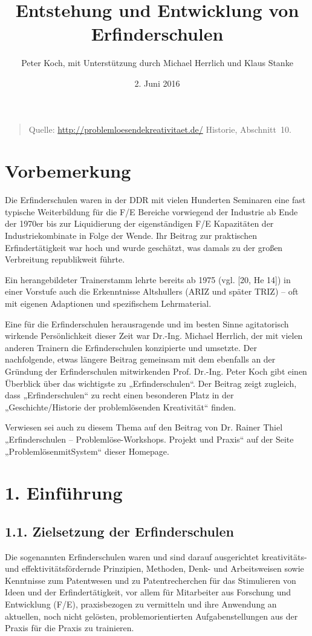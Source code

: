 \documentclass[11pt,a4paper]{article}
\title{Entstehung und Entwicklung von Erfinderschulen}
\author{Peter Koch, mit Unterstützung durch Michael Herrlich und Klaus Stanke}
\date{2. Juni 2016}
\begin{document}
\maketitle

\begin{quote}
  Quelle: \url{http://problemloesendekreativitaet.de/} Historie, Abschnitt~10.

\end{quote}

\section*{Vorbemerkung}

Die Erfinderschulen waren in der DDR mit vielen Hunderten Seminaren eine fast
typische Weiterbildung für die F/E Bereiche vorwiegend der Industrie ab Ende
der 1970er bis zur Liquidierung der eigenständigen F/E Kapazitäten der
Industriekombinate in Folge der Wende. Ihr Beitrag zur praktischen
Erfindertätigkeit war hoch und wurde geschätzt, was damals zu der großen
Verbreitung republikweit führte. 

Ein herangebildeter Trainerstamm lehrte bereits ab 1975 (vgl. [20, He 14]) in
einer Vorstufe auch die Erkenntnisse Altshullers (ARIZ und später TRIZ) – oft
mit eigenen Adaptionen und spezifischem Lehrmaterial.

Eine für die Erfinderschulen herausragende und im besten Sinne agitatorisch
wirkende Per\-sön\-lich\-keit dieser Zeit war Dr.-Ing. Michael Herrlich, der
mit vielen anderen Trainern die Erfinderschulen konzipierte und umsetzte. Der
nachfolgende, etwas längere Beitrag gemeinsam mit dem ebenfalls an der
Gründung der Erfinderschulen mitwirkenden Prof. Dr.-Ing. Peter Koch gibt einen
Überblick über das wichtigste zu „Erfinderschulen“. Der Beitrag zeigt
zugleich, dass „Erfinderschulen“ zu recht einen besonderen Platz in der
„Geschichte/Historie der problemlösenden Kreativität“ finden.

Verwiesen sei auch zu diesem Thema auf den Beitrag von Dr. Rainer Thiel
„Erfinderschulen -- Problemlöse-Workshops. Projekt und Praxis“ auf der Seite
„ProblemlösenmitSystem“ dieser Homepage.

\section*{1. Einführung}

\subsection*{1.1. Zielsetzung der Erfinderschulen}
Die sogenannten Erfinderschulen waren und sind darauf ausgerichtet
kreativitäts- und effektivitätsfördernde Prinzipien, Methoden, Denk- und
Arbeitsweisen sowie Kenntnisse zum Patentwesen und zu Patentrecherchen für
das Stimulieren von Ideen und der Erfindertätigkeit, vor allem für Mitarbeiter
aus Forschung und Entwicklung (F/E), praxisbezogen zu vermitteln und ihre
Anwendung an aktuellen, noch nicht gelösten, problemorientierten
Aufgabenstellungen aus der Praxis für die Praxis zu trainieren.
\end{document}
